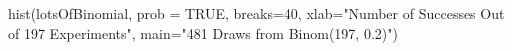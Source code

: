 \begin{Schunk}
\begin{Sinput}
  hist(lotsOfBinomial, prob = TRUE, breaks=40, xlab="Number of Successes Out of 197 Experiments", main="481 Draws from Binom(197, 0.2)")
\end{Sinput}
\end{Schunk}
